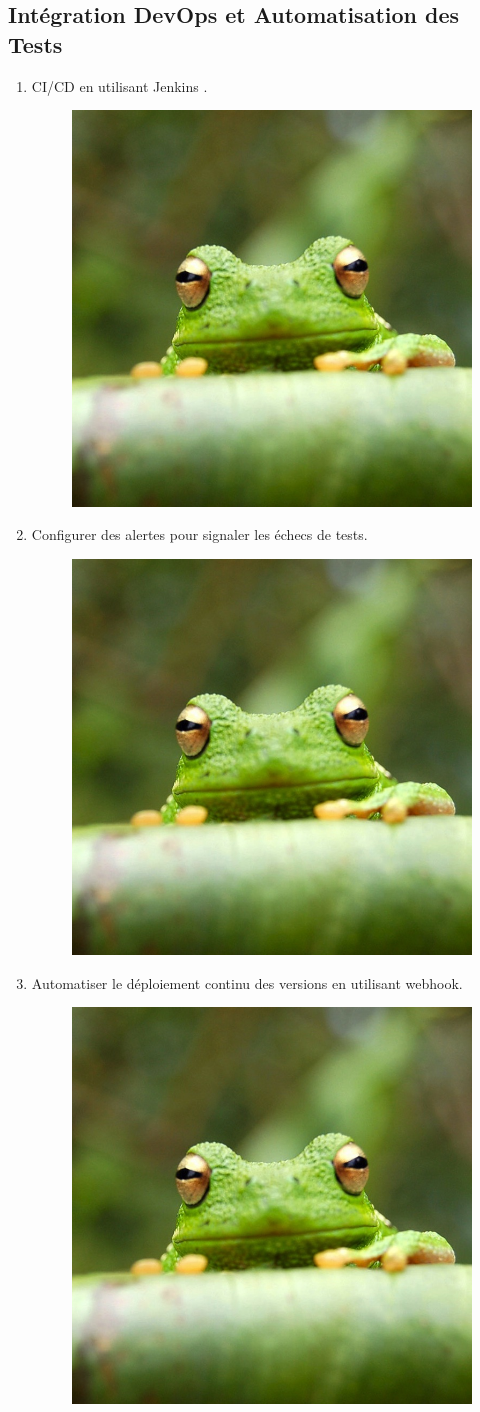 \documentclass{article}
\begin{document}
\subsection{Intégration DevOps et Automatisation des Tests}

\begin{enumerate}
    \item CI/CD en utilisant Jenkins .
    \begin{figure}[H]
        \centering
        \includegraphics[width=0.5\linewidth]{assets/frog.jpg}
        \end{figure}
    \item Configurer des alertes pour signaler les échecs de tests.
    \begin{figure}[H]
        \centering
        \includegraphics[width=0.5\linewidth]{assets/frog.jpg}
        \end{figure}
    \item Automatiser le déploiement continu des versions en utilisant webhook.
    \begin{figure}[H]
        \centering
        \includegraphics[width=0.5\linewidth]{assets/frog.jpg}
        \end{figure}
\end{enumerate}
\end{document}
